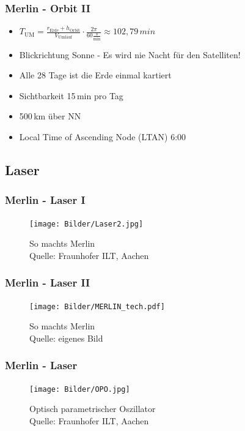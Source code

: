 \documentclass{beamer}
\begin{document}
\begin{frame}
  \frametitle{Merlin - Orbit II}
  \begin{itemize}
    \item $T_{\mathrm{UM}} = \frac{r_{\mathrm{Erde}}+h_{\mathrm{Orbit}}}{V_{\mathrm{Umlauf}}}\cdot \frac{2\pi}{60\frac{\mathrm{s}}{\mathrm{min}}} \approx 102,79\,min$
    \item Blickrichtung Sonne - Es wird nie Nacht für den Satelliten!
    \item Alle 28 Tage ist die Erde einmal kartiert
    \item Sichtbarkeit 15\,min pro Tag
    \item 500\,km über NN
    \item Local Time of Ascending Node (LTAN) 6:00
  \end{itemize}
\end{frame}

\subsection{Laser}

\begin{frame}
  \frametitle{Merlin - Laser I}
  \begin{figure}[t]
    \centering
    \texttt{[image: Bilder/Laser2.jpg]}
    \caption{So machts Merlin\\ 
    Quelle: Fraunhofer ILT, Aachen}\label{fig:MERLASER}
  \end{figure}
\end{frame}

\begin{frame}
  \frametitle{Merlin - Laser II}
  \begin{figure}[t]
    \centering
    \texttt{[image: Bilder/MERLIN\_tech.pdf]}
    \caption{So machts Merlin\\ 
    Quelle: eigenes Bild}\label{fig:MERLASER}
  \end{figure}
\end{frame}

\begin{frame}
  \frametitle{Merlin - Laser }
  \begin{figure}[t]
    \centering
    \texttt{[image: Bilder/OPO.jpg]}
    \caption{Optisch parametrischer Oszillator\\ 
    Quelle: Fraunhofer ILT, Aachen}\label{fig:MERLASER}
  \end{figure}
\end{frame}
\end{document}
